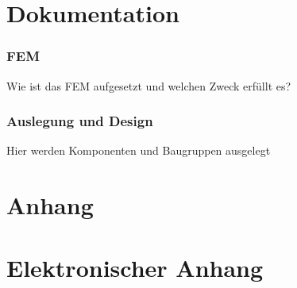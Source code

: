 \documentclass[twoside, 11pt]{article}
\begin{document}
  

  \setcounter{page}{2}
  
  

  \tableofcontents
  \newpage

  
  \printnomenclature
  \newpage

  \setcounter{page}{1}
  \part{Dokumentation}
  
  
  
  
  \section{FEM}
  Wie ist das FEM aufgesetzt und welchen Zweck erfüllt es?
  \section{Auslegung und Design}
  Hier werden Komponenten und Baugruppen ausgelegt




  \part{Anhang}
  \appendix
  
  
  
  

  \part{Elektronischer Anhang}
  \appendix
  
\end{document}
